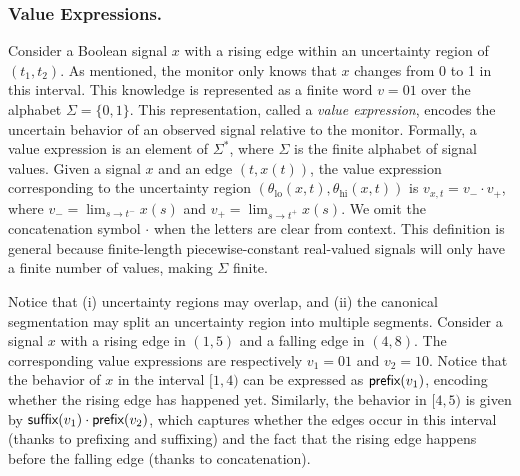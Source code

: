 \subsubsection{Value Expressions.}
Consider a Boolean signal \( x \) with a rising edge within an uncertainty region of \((t_1, t_2)\).
As mentioned, the monitor only knows that \( x \) changes from 0 to 1 in this interval.
This knowledge is represented as a finite word \( v = 01 \) over the alphabet \(\Sigma = \{0,1\}\).
This representation, called a \emph{value expression}, encodes the uncertain behavior of an observed signal relative to the monitor.
Formally, a value expression is an element of \(\Sigma^*\), where \(\Sigma\) is the finite alphabet of signal values.
Given a signal \( x \) and an edge \((t, x(t))\), the value expression corresponding to the uncertainty region \((\theta_{\text{lo}}(x,t), \theta_{\text{hi}}(x,t))\) is \( v_{x,t} = v_- \cdot v_+ \), where \( v_- = \lim_{s \to t^-} x(s) \) and \( v_+ = \lim_{s \to t^+} x(s) \).
We omit the concatenation symbol \(\cdot\) when the letters are clear from context.
This definition is general because finite-length piecewise-constant real-valued signals will only have a finite number of values, making \(\Sigma\) finite.

Notice that (i) uncertainty regions may overlap, and (ii) the canonical segmentation may split an uncertainty region into multiple segments.
Consider a signal $x$ with a rising edge in $(1,5)$ and a falling edge in $(4,8)$.
The corresponding value expressions are respectively $v_1 = 01$ and $v_2 = 10$.
Notice that the behavior of $x$ in the interval $[1,4)$ can be expressed as $\textsf{prefix}(v_1)$, encoding whether the rising edge has happened yet.
Similarly, the behavior in $[4,5)$ is given by $\textsf{suffix}(v_1) \cdot \textsf{prefix}(v_2)$, which captures whether the edges occur in this interval (thanks to prefixing and suffixing) and the fact that the rising edge happens before the falling edge (thanks to concatenation).

%	
%


